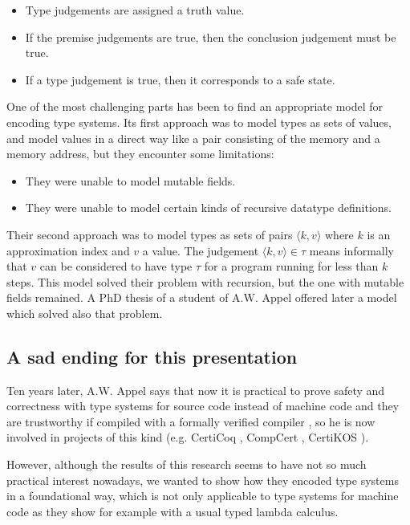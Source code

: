 \documentclass{article}
\begin{document}
\begin{itemize}
  \item Type judgements are assigned a truth value.
  \item If the premise judgements are true, then the 
    conclusion judgement must be true.
  \item If a type judgement is true, then it corresponds
    to a safe state.
\end{itemize}

One of the most challenging parts has been to find an 
appropriate model for encoding type systems. Its first 
approach \cite{appel:fpcc:semantic} was to model types as 
sets of values, and model values in a direct way like a 
pair consisting of the memory and a memory address, but 
they encounter some limitations:

\begin{itemize}
  \item They were unable to model mutable fields.
  \item They were unable to model certain kinds of 
    recursive datatype definitions.
\end{itemize}

Their second approach \cite{appel:fpcc:indexed} was to 
model types as sets of pairs $\langle k, v \rangle$ where 
$k$ is an approximation index and $v$ a value. The 
judgement $\langle k, v \rangle \in \tau$ means informally 
that $v$ can be considered to have type $\tau$ for a 
program running for less than $k$ steps. This model solved 
their problem with recursion, but the one with mutable 
fields remained. A PhD thesis of a student of A.W. Appel 
offered later a model which solved also that problem. 

\subsection*{A sad ending for this presentation}

Ten years later, A.W. Appel says that now it is practical 
to prove safety and correctness with type systems for 
source code instead of machine code and they are 
trustworthy if compiled with a formally verified compiler
\cite{appel:fpcc:compilers}, so he is now involved in 
projects of this kind (e.g. CertiCoq 
\cite{website:certicoq}, CompCert \cite{website:compcert}, 
CertiKOS \cite{website:certikos}).

However, although the results of this research seems to 
have not so much practical interest nowadays, we wanted to
show how they encoded type systems in a foundational way, 
which is not only applicable to type systems for machine 
code as they show for example with a usual typed lambda 
calculus.
{}

\end{document}
